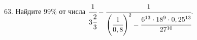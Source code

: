63. Найдите $99\%$ от числа $\cfrac{1}{3\cfrac{2}{3}}-\cfrac{1}{\left(\cfrac{1}{0,8}\right)^2-\cfrac{6^{13}\cdot18^9\cdot0,25^{13}}{27^{10}}}.$
\newpage
